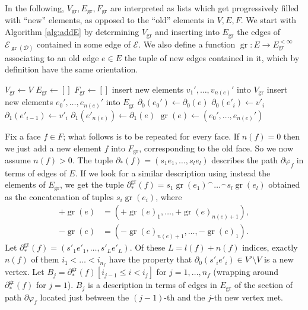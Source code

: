 \documentclass[11pt,reqno]{amsart}
\theoremstyle{plain}
\theoremstyle{definition}
\theoremstyle{remark}
\numberwithin{equation}{subsection}
\newcommand*{\calD}{\mathcal{D}}
\newcommand*{\calE}{\mathcal{E}}
\DeclareMathOperator{\gr}{gr}
\begin{document}
In the following, $V_{\gr},E_{\gr},F_{\gr}$ are interpreted as lists which get progressively filled with ``new'' elements, as opposed to the ``old'' elements in $V,E,F$. We start with Algorithm \ref{alg:addE} by determining $V_{\gr}$ and inserting into $E_{\gr}$ the edges of $\calE_{\gr(\calD)}$ contained in some edge of $\calE$. We also define a function $\gr\colon E\to E_{\gr}^{<\infty}$ associating to an old edge $e\in E$ the tuple of new edges contained in it, which by definition have the same orientation.

\begin{algorithm}
\caption{Filling $V_{\gr},E_{\gr}$ and the values of $\partial_0,\partial_1\colon E_{\gr}\to V_{\gr}$, $\gr\colon E\to E_{\gr}^{<\infty}$}\label{alg:addE}
\begin{algorithmic}
\State $V_{\gr} \gets V$
\State $E_{\gr} \gets []$
\State $F_{\gr} \gets []$
\State insert new elements $v_1',\dots,v_{n(e)}'$ into $V_{\gr}$
\State insert new elements $e_0',\dots,e_{n(e)}'$ into $E_{\gr}$
\State $\partial_0(e_0') \gets \partial_0(e)$
\State $\partial_0(e'_i) \gets v'_i$
\State $\partial_1(e'_{i-1}) \gets v'_i$
\EndFor
\State $\partial_1(e'_{n(e)}) \gets \partial_1(e)$
\State $\gr(e) \gets (e_0',\dots,e_{n(e)}')$
\EndFor
\end{algorithmic}
\end{algorithm}

Fix a face $f\in F$; what follows is to be repeated for every face. If $n(f)=0$ then we just add a new element $f$ into $F_{\gr}$, corresponding to the old face. So we now assume $n(f)>0$. The tuple $\partial_*(f)=(s_1e_1,\dots,s_le_l)$ describes the path $\partial\varphi_f$ in terms of edges of $E$. If we look for a similar description using instead the elements of $E_{\gr}$, we get the tuple $\partial^{\gr}_*(f)=s_1\gr(e_1)^\frown\dots^\frown s_l\gr(e_l)$
obtained as the concatenation of tuples $s_i\gr(e_i)$, where
\begin{align*}
    +\gr(e)&=(+\gr(e)_1,\dots,+\gr(e)_{n(e)+1}),\\
    -\gr(e)&=(-\gr(e)_{n(e)+1},\dots,-\gr(e)_1).
\end{align*}
Let $\partial^{\gr}_*(f)=(s'_1e'_1,\dots,s'_{L}e'_{L})$. Of these $L=l(f)+n(f)$ indices, exactly $n(f)$ of them $i_1<\dots<i_{n_f}$ have the property that $\partial_0(s'_ie'_i)\in V'\setminus V$ is a new vertex. Let $B_j=\partial^{\gr}_*(f)[i_{j-1}\le i<i_j]$ for $j=1,\dots,n_f$ (wrapping around $\partial^{\gr}_*(f)$ for $j=1$). $B_j$ is a description in terms of edges in $E_{\gr}$ of the section of path $\partial\varphi_f$ located just between the $(j-1)$-th and the $j$-th new vertex met.
\end{document}

